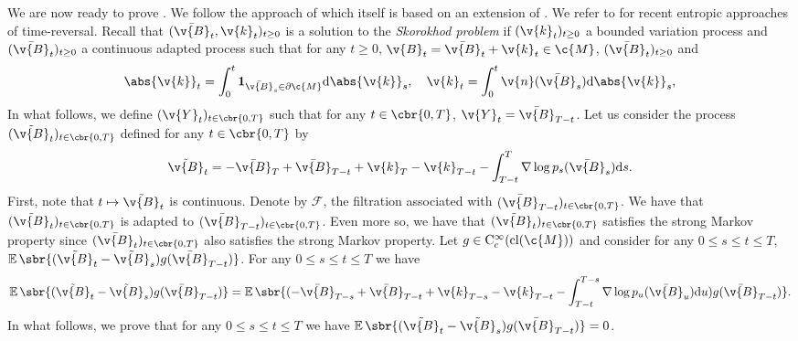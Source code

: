 We are now ready to prove .
We follow the approach of \cite{petit1997Time} which itself is based on an extension of \cite{haussmann1986time}.
We refer to \textcite{cattiaux2021time} for recent entropic approaches of time-reversal.
Recall that \((\bar{\v{B}}_t, \v{k}_t)_{t \geq 0}\) is a solution to the \emph{Skorokhod problem} \parencite{skorokhod1961stochastic} if \((\v{k}_t)_{t \geq 0}\) a bounded variation process and \((\bar{\v{B}}_t)_{t \geq 0}\) a continuous adapted process such that for any \(t \geq 0\), \(\v{B}_t = \bar{\v{B}}_t + \v{k}_t \in \c{M}\), \((\bar{\v{B}}_t)_{t \geq 0}\) and \begin{equation} \label{eq:skorokhod_app} {\abs{\v{k}}_t = \int_0^t \mathbf{1}_{\bar{\v{B}}_s \in \partial \c{M}} \mathrm{d} \abs{\v{k}}_s , \quad \v{k}_t = \int_0^t \v{n}(\bar{\v{B}}_s) \mathrm{d} \abs{\v{k}}_s ,} \end{equation} In what follows, we define \((\v{Y}_t)_{t \in \cbr{0,T}}\) such that for any \(t \in \cbr{0,T}\), \(\v{Y}_t = \bar{\v{B}}_{T-t}\).
Let us consider the process \((\tilde{\v{B}}_t)_{t \in \cbr{0,T}}\) defined for any \(t \in \cbr{0,T}\) by \begin{equation} {\tilde{\v{B}}_t = -\bar{\v{B}}_T + \bar{\v{B}}_{T-t} + \v{k}_T - \v{k}_{T-t} - \int_{T-t}^T \nabla \log p_s(\bar{\v{B}}_s) \mathrm{d} s .
	}
\end{equation}
First, note that \(t \mapsto \tilde{\v{B}}_t\) is continuous.
Denote by \(\mathcal{F}\), the filtration associated with \((\bar{\v{B}}_{T-t})_{t \in \cbr{0,T}}\).
We have that \((\tilde{\v{B}}_t)_{t \in \cbr{0,T}}\) is adapted to \((\bar{\v{B}}_{T-t})_{t \in \cbr{0,T}}\).
Even more so, we have that \((\tilde{\v{B}}_t)_{t \in \cbr{0,T}}\) satisfies the strong Markov property since \((\bar{\v{B}}_t)_{t \in \cbr{0,T}}\) also satisfies the strong Markov property.
Let \(g \in \mathrm{C}_c^\infty(\mathrm{cl}(\c{M}))\) and consider for any \(0 \leq s \leq t \leq T\), \(\E\sbr{(\tilde{\v{B}}_t - \tilde{\v{B}}_s)g(\bar{\v{B}}_{T-t})}\).
For any \(0 \leq s \leq t \leq T\) we have \begin{equation} \label{eq:first_equality} \E\sbr{(\tilde{\v{B}}_t - \tilde{\v{B}}_s)g(\bar{\v{B}}_{T-t})} = {\E\sbr{(-\bar{\v{B}}_{T-s} + \bar{\v{B}}_{T-t} + \v{k}_{T-s} - \v{k}_{T-t} - \int_{T-t}^{T-s} \nabla \log p_u(\bar{\v{B}}_u) \mathrm{d} u) g(\bar{\v{B}}_{T-t})} .
	}
\end{equation}
In what follows, we prove that for any \(0 \leq s \leq t \leq T\) we have \(\E\sbr{(\tilde{\v{B}}_t - \tilde{\v{B}}_s)g(\bar{\v{B}}_{T-t})} = 0\).
